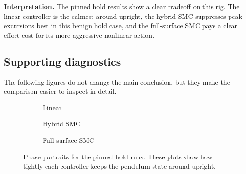 
\noindent\textbf{Interpretation.} The pinned hold results show a clear tradeoff on this rig. The linear controller is the calmest around upright, the hybrid SMC suppresses peak excursions best in this benign hold case, and the full-surface SMC pays a clear effort cost for its more aggressive nonlinear action.

\subsection*{Supporting diagnostics}
The following figures do not change the main conclusion, but they make the comparison easier to inspect in detail.

\begin{figure}[htbp]
  \centering
  \begin{subfigure}[t]{0.32\linewidth}
    \centering
    \caption{Linear}
  \end{subfigure}\hfill
  \begin{subfigure}[t]{0.32\linewidth}
    \centering
    \caption{Hybrid SMC}
  \end{subfigure}\hfill
  \begin{subfigure}[t]{0.32\linewidth}
    \centering
    \caption{Full-surface SMC}
  \end{subfigure}
  \caption{Phase portraits for the pinned hold runs. These plots show how tightly each controller keeps the pendulum state around upright.}
  \label{fig:hold_phase_support}
\end{figure}

